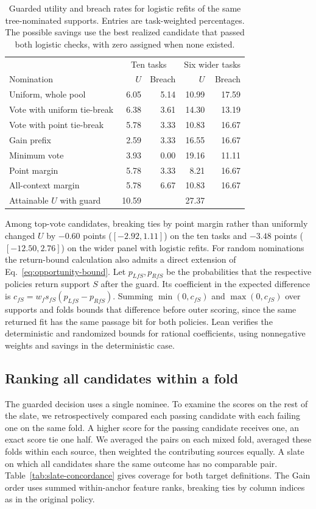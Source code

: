 \begin{table}[htb]
\centering\small
\caption{Guarded utility and breach rates for logistic refits of the same tree-nominated supports. Entries are task-weighted percentages. The possible savings use the best realized candidate that passed both logistic checks, with zero assigned when none existed.}
\label{tab:receiver}
\begin{tabular}{lrr@{\qquad}rr}
\toprule
&\multicolumn{2}{c}{Ten tasks}&\multicolumn{2}{c}{Six wider tasks}\\
Nomination & $U$ & Breach & $U$ & Breach\\
\midrule
Uniform, whole pool & 6.05 & 5.14 & 10.99 & 17.59\\
Vote with uniform tie-break & 6.38 & 3.61 & 14.30 & 13.19\\
Vote with point tie-break & 5.78 & 3.33 & 10.83 & 16.67\\
Gain prefix & 2.59 & 3.33 & 16.55 & 16.67\\
Minimum vote & 3.93 & 0.00 & 19.16 & 11.11\\
Point margin & 5.78 & 3.33 & 8.21 & 16.67\\
All-context margin & 5.78 & 6.67 & 10.83 & 16.67\\
\midrule
Attainable $U$ with guard &10.59 &&27.37&\\
\bottomrule
\end{tabular}
\end{table}

Among top-vote candidates, breaking ties by point margin rather than uniformly changed $U$ by $-0.60$ points ($[-2.92,1.11]$) on the ten tasks and $-3.48$ points ($[-12.50,2.76]$) on the wider panel with logistic refits. For random nominations the return-bound calculation also admits a direct extension of Eq.~\eqref{eq:opportunity-bound}. Let $p_{LfS},p_{RfS}$ be the probabilities that the respective policies return support $S$ after the guard. Its coefficient in the expected difference is $c_{fS}=w_f s_{fS}(p_{LfS}-p_{RfS})$. Summing $\min(0,c_{fS})$ and $\max(0,c_{fS})$ over supports and folds bounds that difference before outer scoring, since the same returned fit has the same passage bit for both policies. Lean verifies the deterministic and randomized bounds for rational coefficients, using nonnegative weights and savings in the deterministic case.

\subsection{Ranking all candidates within a fold}
\label{sec:slate-concordance}
The guarded decision uses a single nominee. To examine the scores on the rest of the slate, we retrospectively compared each passing candidate with each failing one on the same fold. A higher score for the passing candidate receives one, an exact score tie one half. We averaged the pairs on each mixed fold, averaged these folds within each source, then weighted the contributing sources equally. A slate on which all candidates share the same outcome has no comparable pair. Table~\ref{tab:slate-concordance} gives coverage for both target definitions. The Gain order uses summed within-anchor feature ranks, breaking ties by column indices as in the original policy.

